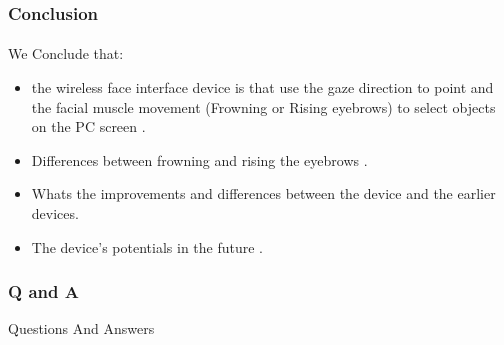 \documentclass{beamer}
\begin{document}
\begin{frame}
\frametitle{Conclusion }
\framesubtitle{}
We Conclude that: 
\begin{itemize} 
\item the wireless face interface device is that use the gaze direction to point and the facial muscle movement (Frowning or Rising eyebrows) to select objects on the PC screen .
\item Differences between frowning and rising the eyebrows .
\item Whats the improvements and differences between the device and the earlier devices. 
\item The device's potentials in the future .
\end{itemize} 
\end{frame}

\begin{frame}
\frametitle{Q and A}

\Huge Questions And Answers
\framesubtitle{}

\end{frame}
\end{document}
